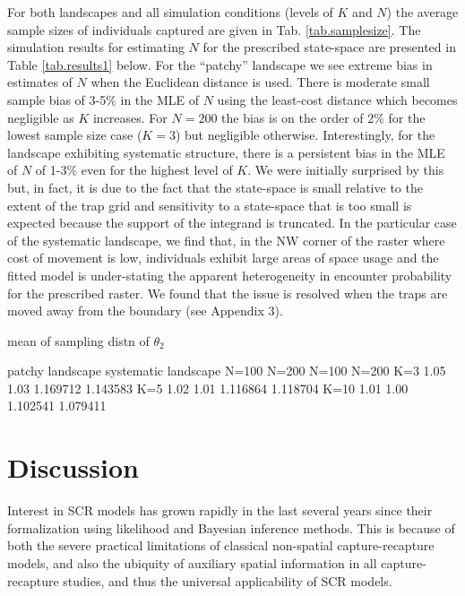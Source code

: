 \documentclass[12pt]{article}
\begin{document}
\begin{spacing}{1.8}
For both landscapes and all simulation conditions (levels of $K$ and
$N$) the average sample sizes of individuals captured are given in
Tab. \ref{tab.samplesize}.  The simulation results for estimating $N$
for the prescribed state-space are presented in Table
\ref{tab.results1} below.  For the ``patchy'' landscape we see extreme
bias in estimates of $N$ when the Euclidean distance is used. There is
moderate small sample bias of 3-5\% in the MLE of $N$ using the
least-cost distance which becomes negligible as $K$ increases. For
$N=200$ the bias is on the order of 2\% for the lowest sample size
case ($K=3$) but negligible otherwise.  Interestingly, for the
landscape exhibiting systematic structure, there is a persistent bias
in the MLE of $N$ of 1-3\% even for the highest level of $K$. We were
initially surprised by this but, in fact, it is due to the fact that
the state-space is small relative to the extent of the trap grid and
sensitivity to a state-space that is too small is expected because the
support of the integrand is truncated. In the particular case of the
systematic landscape, we find that, in the NW corner of the raster
where cost of movement is low, individuals exhibit large areas of
space usage and the fitted model is under-stating the apparent
heterogeneity in encounter probability for the prescribed raster.  We
found that the issue is resolved when the traps are moved away from
the boundary (see Appendix 3).


mean of sampling distn of $\theta_{2}$

     patchy landscape     systematic landscape
      N=100   N=200        N=100   N=200
K=3    1.05    1.03      1.169712 1.143583
K=5    1.02    1.01      1.116864 1.118704
K=10   1.01    1.00      1.102541 1.079411








\section{Discussion}

Interest in SCR models has grown rapidly in the last several years
since their formalization using likelihood
\citep{borchers_efford:2008} and Bayesian \citep{royle_young:2008}
inference methods. This is because of both the severe practical
limitations of classical non-spatial capture-recapture models, and
also the ubiquity of auxiliary spatial information in all
capture-recapture studies, and thus the universal applicability of SCR
models.


\end{spacing}
\end{document}
